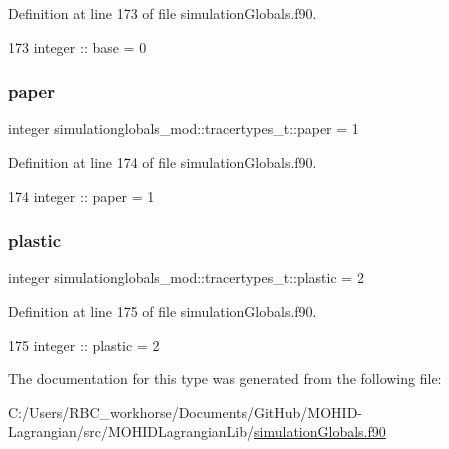 Definition at line 173 of file simulation\+Globals.\+f90.


\begin{DoxyCode}
173         \textcolor{keywordtype}{integer} :: base  = 0
\end{DoxyCode}
\mbox{\label{structsimulationglobals__mod_1_1tracertypes__t_a2f1cf14744f82ea11344cfc7ec1daa7d}} 
\subsubsection{\texorpdfstring{paper}{paper}}
{\footnotesize\ttfamily integer simulationglobals\+\_\+mod\+::tracertypes\+\_\+t\+::paper = 1\hspace{0.3cm}{\ttfamily [private]}}



Definition at line 174 of file simulation\+Globals.\+f90.


\begin{DoxyCode}
174         \textcolor{keywordtype}{integer} :: paper   = 1
\end{DoxyCode}
\mbox{\label{structsimulationglobals__mod_1_1tracertypes__t_a7996bd824036f8a4f4febde191b46afc}} 
\subsubsection{\texorpdfstring{plastic}{plastic}}
{\footnotesize\ttfamily integer simulationglobals\+\_\+mod\+::tracertypes\+\_\+t\+::plastic = 2\hspace{0.3cm}{\ttfamily [private]}}



Definition at line 175 of file simulation\+Globals.\+f90.


\begin{DoxyCode}
175         \textcolor{keywordtype}{integer} :: plastic = 2
\end{DoxyCode}


The documentation for this type was generated from the following file\+:\begin{DoxyCompactItemize}
\item 
C\+:/\+Users/\+R\+B\+C\+\_\+workhorse/\+Documents/\+Git\+Hub/\+M\+O\+H\+I\+D-\/\+Lagrangian/src/\+M\+O\+H\+I\+D\+Lagrangian\+Lib/\mbox{\hyperlink{simulation_globals_8f90}{simulation\+Globals.\+f90}}\end{DoxyCompactItemize}
